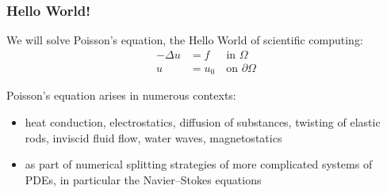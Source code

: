 \begin{frame}
  \frametitle{Hello World!}

  We will solve Poisson's equation, the Hello World of scientific
  computing:
  \begin{equation*}
    \begin{split}
      - \Delta u &= f \,\,\, \quad \mbox{in } \Omega
      \\
    u &= u_0 \quad \mbox{on } \partial \Omega
    \end{split}
  \end{equation*}

  Poisson's equation arises in numerous contexts:
  \begin{itemize}
  \item
    heat conduction, electrostatics, diffusion
    of substances, twisting of elastic rods, inviscid fluid flow, water
    waves, magnetostatics
  \item
    as part of numerical splitting strategies of more complicated
    systems of PDEs, in particular the Navier--Stokes equations
  \end{itemize}

\end{frame}
